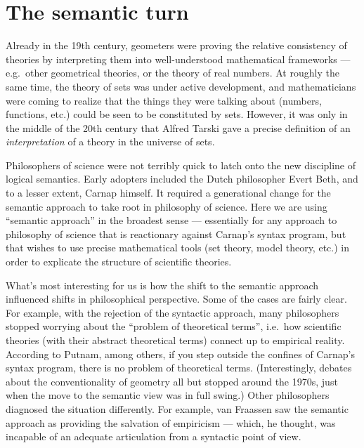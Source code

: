 



\section{The semantic turn}

Already in the 19th century, geometers were proving the relative
consistency of theories by interpreting them into well-understood
mathematical frameworks --- e.g.\ other geometrical theories, or the
theory of real numbers.  At roughly the same time, the theory of sets
was under active development, and mathematicians were coming to
realize that the things they were talking about (numbers, functions,
etc.) could be seen to be constituted by sets.  However, it was only
in the middle of the 20th century that Alfred Tarski gave a precise
definition of an {\it interpretation} of a theory in the universe of
sets.  

Philosophers of science were not terribly quick to latch onto the new
discipline of logical semantics.  Early adopters included the Dutch
philosopher Evert Beth, and to a lesser extent, Carnap himself.  It
required a generational change for the semantic approach to take root
in philosophy of science.  Here we are using ``semantic approach'' in
the broadest sense --- essentially for any approach to philosophy of
science that is reactionary against Carnap's syntax program, but that
wishes to use precise mathematical tools (set theory, model theory,
etc.) in order to explicate the structure of scientific theories.

What's most interesting for us is how the shift to the semantic
approach influenced shifts in philosophical perspective.  Some of the
cases are fairly clear.  For example, with the rejection of the
syntactic approach, many philosophers stopped worrying about the
``problem of theoretical terms'', i.e.\ how scientific theories (with
their abstract theoretical terms) connect up to empirical reality.
According to Putnam, among others, if you step outside the confines of
Carnap's syntax program, there is no problem of theoretical terms.
(Interestingly, debates about the conventionality of geometry all but
stopped around the 1970s, just when the move to the semantic view was
in full swing.)  Other philosophers diagnosed the situation
differently.  For example, van Fraassen saw the semantic approach as
providing the salvation of empiricism --- which, he thought, was
incapable of an adequate articulation from a syntactic point of view.

